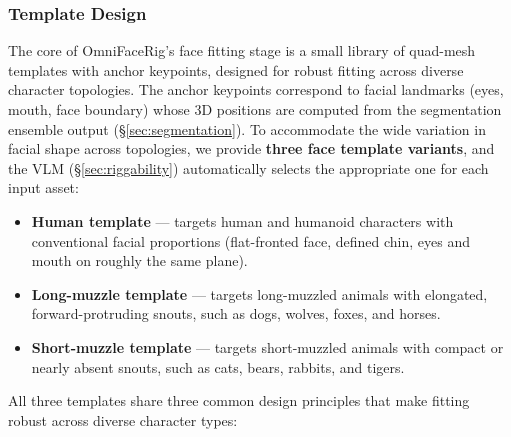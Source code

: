 \documentclass[acmtog,anonymous,review]{acmart}
\begin{document}
\subsubsection{Template Design}

The core of OmniFaceRig's face fitting stage is a small library of quad-mesh templates with anchor keypoints, designed for robust fitting across diverse character topologies. The anchor keypoints correspond to facial landmarks (eyes, mouth, face boundary) whose 3D positions are computed from the segmentation ensemble output (\S\ref{sec:segmentation}). To accommodate the wide variation in facial shape across topologies, we provide \textbf{three face template variants}, and the VLM (\S\ref{sec:riggability}) automatically selects the appropriate one for each input asset:

\begin{itemize}
  \item \textbf{Human template} --- targets human and humanoid characters with conventional facial proportions (flat-fronted face, defined chin, eyes and mouth on roughly the same plane).
  \item \textbf{Long-muzzle template} --- targets long-muzzled animals with elongated, forward-protruding snouts, such as dogs, wolves, foxes, and horses.
  \item \textbf{Short-muzzle template} --- targets short-muzzled animals with compact or nearly absent snouts, such as cats, bears, rabbits, and tigers.
\end{itemize}

All three templates share three common design principles that make fitting robust across diverse character types:
\end{document}
